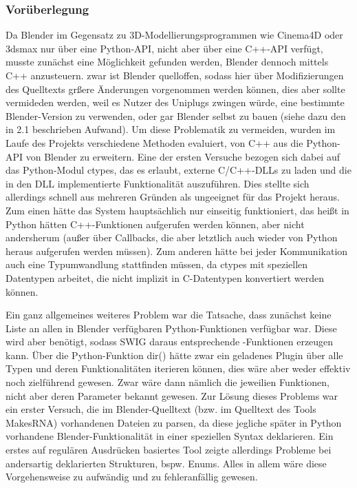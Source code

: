 
\label{sec:header}

\subsubsection{Vorüberlegung}

Da Blender im Gegensatz zu 3D-Modellierungsprogrammen wie Cinema4D oder 3dsmax nur über eine Python-API, nicht aber über eine C++-API verfügt, musste zunächst eine Möglichkeit gefunden werden, Blender dennoch mittels C++ anzusteuern. zwar ist Blender quelloffen, sodass hier über Modifizierungen des Quelltexts grßere Änderungen vorgenommen werden können, dies aber sollte vermideden werden, weil es Nutzer des Uniplugs zwingen würde, eine bestimmte Blender-Version zu verwenden, oder gar Blender selbst zu bauen (siehe dazu den in 2.1 beschrieben Aufwand). Um diese Problematik zu vermeiden, wurden im Laufe des Projekts verschiedene Methoden evaluiert, von C++ aus die Python-API von Blender zu erweitern. Eine der ersten Versuche bezogen sich dabei auf das Python-Modul ctypes, das es erlaubt, externe C/C++-DLLs zu laden und die in den DLL implementierte Funktionalität auszuführen. Dies stellte sich allerdings schnell aus mehreren Gründen als ungeeignet für das Projekt heraus. Zum einen hätte das System hauptsächlich nur einseitig funktioniert, das heißt in Python hätten C++-Funktionen aufgerufen werden können, aber nicht andersherum (außer über Callbacks, die aber letztlich auch wieder von Python heraus aufgerufen werden müssen). Zum anderen hätte bei jeder Kommunikation auch eine Typumwandlung stattfinden müssen, da ctypes mit speziellen Datentypen arbeitet, die nicht implizit in C-Datentypen konvertiert werden können.

Ein ganz allgemeines weiteres Problem war die Tatsache, dass zunächst keine Liste an allen in Blender verfügbaren Python-Funktionen verfügbar war. Diese wird aber benötigt, sodass SWIG daraus entsprechende \CS{}-Funktionen erzeugen kann. Über die Python-Funktion dir() hätte zwar ein geladenes Plugin über alle Typen und deren Funktionalitäten iterieren können, dies wäre aber weder effektiv noch zielführend gewesen. Zwar wäre dann nämlich die jeweilien Funktionen, nicht aber deren Parameter bekannt gewesen. Zur Lösung dieses Problems war ein erster Versuch, die im Blender-Quelltext (bzw. im Quelltext des Tools MakesRNA) vorhandenen Dateien zu parsen, da diese jegliche später in Python vorhandene Blender-Funktionalität in einer speziellen Syntax deklarieren. Ein erstes auf regulären Ausdrücken basiertes Tool zeigte allerdings Probleme bei andersartig deklarierten Strukturen, bspw. Enums. Alles in allem wäre diese Vorgehensweise zu aufwändig und zu fehleranfällig gewesen.

